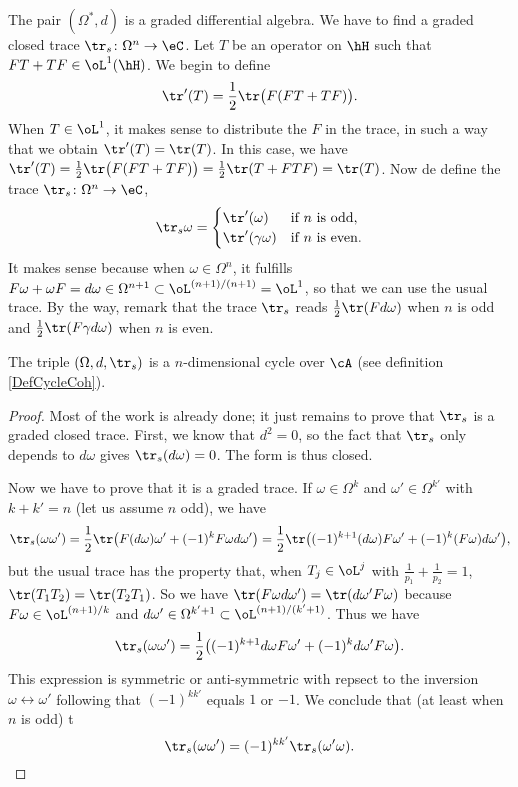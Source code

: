 The pair $(\Omega^*,d)$ is a graded differential algebra. We have to find a graded closed trace $\tr_s\colon \Omega^n\to \eC$. Let $T$ be an operator on $\hH$ such that $FT+TF\in\oL^1(\hH)$. We begin to define
\[ 
  \tr'(T)=\frac{ 1 }{2}\tr\big( F(FT+TF) \big).
\]
When $T\in\oL^1$, it makes sense to distribute the $F$ in the trace, in such a way that we obtain $\tr'(T)=\tr(T)$. In this case, we have
  $\tr'(T)=\frac{ 1 }{2}\tr\big( F(FT+TF) \big)=\frac{ 1 }{2}\tr(T+FTF)=\tr(T)$.
Now de define the trace $\tr_s\colon \Omega^n\to \eC$,
\[ 
  \tr_s\omega=
\begin{cases}
\tr'(\omega)&\text{if $n$ is odd},\\
\tr'(\gamma\omega)&\text{if $n$ is even}.
\end{cases}
\]
It makes sense because when $\omega\in\Omega^n$, it fulfills $F\omega+\omega F=d\omega\in\Omega^{n+1}\subset\oL^{(n+1)/(n+1)}=\oL^1$, so that we can use the usual trace. By the way, remark that the trace $\tr_s$ reads $\frac{ 1 }{2}\tr(Fd\omega)$ when $n$ is odd and $\frac{ 1 }{2}\tr(F\gamma d\omega)$ when $n$ is even.

\begin{proposition}
	The triple $(\Omega,d,\tr_s)$ is a $n$-dimensional cycle over  $\cA$ (see definition \ref{DefCycleCoh}).
\end{proposition}

\begin{proof}
Most of the work is already done; it just remains to prove that $\tr_s$ is a graded closed trace. First, we know that $d^2=0$, so the fact that $\tr_s$ only depends to $d\omega$ gives $\tr_s(d\omega)=0$. The form is thus closed.

Now we have to prove that it is a graded trace. If $\omega\in\Omega^k$ and $\omega'\in\Omega^{k'}$ with $k+k'=n$ (let us assume $n$ odd), we have
\[ 
  \tr_s(\omega\omega')=\frac{ 1 }{2}\tr\big( F(d\omega)\omega'+(-1)^{k}F\omega d\omega' \big)=\frac{ 1 }{2}\tr\big( (-1)^{k+1}(d\omega)F\omega'+(-1)^k(F\omega)d\omega' \big),
\]
but the usual trace has the property that, when $T_j\in\oL^j$ with $\frac{1}{ p_1 }+\frac{1}{ p_2 }=1$, $\tr(T_1T_2)=\tr(T_2T_1)$. So we have $\tr(F\omega d\omega')=\tr(d\omega'F\omega)$ because $F\omega\in\oL^{(n+1)/  k }$ and $d\omega'\in\Omega^{k'+1}\subset\oL^{(n+1)/(k'+1)}$. Thus we have
\[ 
  \tr_s(\omega\omega')=\frac{ 1 }{2}\big( (-1)^{k+1}d\omega F\omega'+(-1)^kd\omega' F\omega \big).
\]
This expression is symmetric or anti-symmetric with repsect to the inversion $\omega\leftrightarrow\omega'$ following that $(-1)^{kk'}$ equals $1$ or $-1$. We conclude that (at least when $n$ is odd) t
\[ 
  \tr_s(\omega\omega')=(-1)^{kk'}\tr_s(\omega'\omega).
\]
\end{proof}


